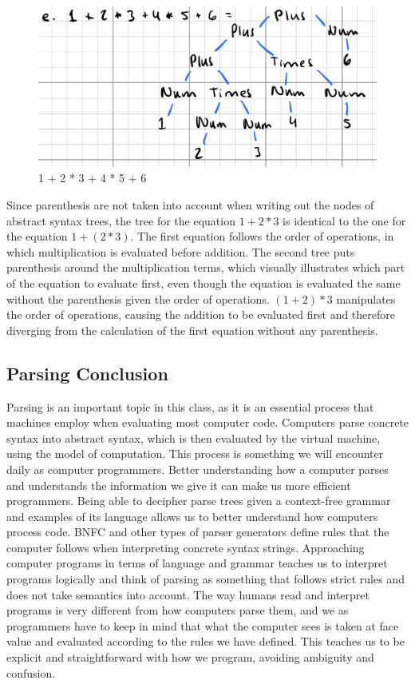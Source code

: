 \documentclass{article}
\theoremstyle{theorem}
\theoremstyle{definition}
\theoremstyle{remark}
\begin{document}
\begin{figure}[H]
\begin{center}
\includegraphics[scale=0.4]{img/A5.png}
\end{center}
\caption{1 + 2 * 3 + 4 * 5 + 6}\label{A5}
\end{figure}

Since parenthesis are not taken into account when writing out the nodes of abstract syntax trees, the tree for the equation $1+2*3$ is identical to the one for the equation $1+(2*3)$. The first equation follows the order of operations, in which multiplication is evaluated before addition. The second tree puts parenthesis around the multiplication terms, which visually illustrates which part of the equation to evaluate first, even though the equation is evaluated the same without the parenthesis given the order of operations. $(1+2)*3$ manipulates the order of operations, causing the addition to be evaluated first and therefore diverging from the calculation of the first equation without any parenthesis. 

\subsection{Parsing Conclusion}

Parsing is an important topic in this class, as it is an essential process that machines employ when evaluating most computer code. Computers parse concrete syntax into abstract syntax, which is then evaluated by the virtual machine, using the model of computation. This process is something we will encounter daily as computer programmers. Better understanding how a computer parses and understands the information we give it can make us more efficient programmers. Being able to decipher parse trees given a context-free grammar and examples of its language allows us to better understand how computers process code. BNFC and other types of parser generators define rules that the computer follows when interpreting concrete syntax strings. Approaching computer programs in terms of language and grammar teaches us to interpret programs logically and think of parsing as something that follows strict rules and does not take semantics into account. The way humans read and interpret programs is very different from how computers parse them, and we as programmers have to keep in mind that what the computer sees is taken at face value and evaluated according to the rules we have defined. This teaches us to be explicit and straightforward with how we program, avoiding ambiguity and confusion.
\end{document}
